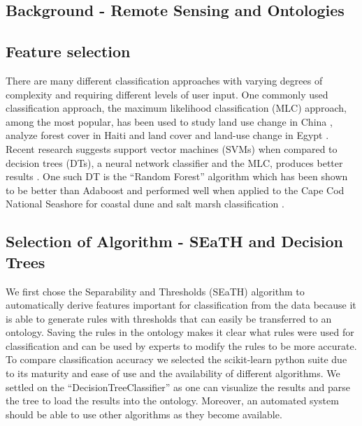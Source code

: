 \documentclass[authoryear, review,12pt,number]{elsarticle}
\begin{document}
\subsection{Background - Remote Sensing and Ontologies}

\subsection{Feature selection}

There are many different classification approaches with varying degrees of
complexity and requiring different levels of user input. One commonly used
classification approach, the maximum likelihood classification (MLC) approach,
among the most popular, has been used to study land use change in China
\citep{Ding2007}, analyze forest cover in Haiti \citep{Churches2014} and land
cover and land-use change in Egypt \citep{Shalaby2007}. Recent research suggests
support vector machines (SVMs) when compared to decision trees (DTs), a neural
network classifier and the MLC, produces better results \citep{Huang2002}. One
such DT is the ``Random Forest'' algorithm which has been shown to be better
than Adaboost \citep{Chan2008} and performed well when applied to the Cape Cod
National Seashore for coastal dune and salt marsh classification
\citep{Timm2012}.

\subsection{Selection of Algorithm - SEaTH and Decision Trees}
We first chose the Separability and Thresholds
(SEaTH) \citep{Nussbaum2006} algorithm to automatically derive features important
for classification from the data because it is able to generate rules with
thresholds that can easily be transferred to an ontology. Saving the rules in
the ontology makes it clear what rules were used for classification and can be
used by experts to modify the rules to be more accurate. To compare
classification accuracy we selected the scikit-learn python suite
\citep{scikit-learn} due to its maturity and ease of use and the availability of
different algorithms. We settled on the ``DecisionTreeClassifier'' as one can
visualize the results and parse the tree to load the results into the ontology.
Moreover, an automated system should be able to use other algorithms as they become available.
\end{document}
